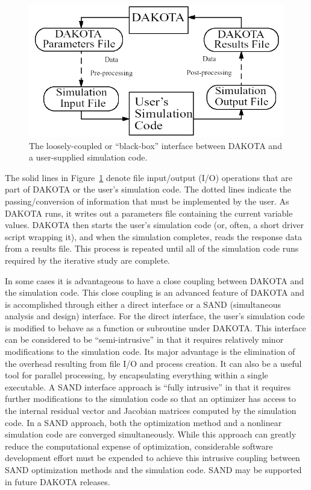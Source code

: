 \begin{figure}
  \centering
  \includegraphics[scale=0.60]{images/dakota_flowchart}
  \caption{The loosely-coupled or ``black-box'' interface between
    DAKOTA and a user-supplied simulation code.}
  \label{introduction:bbinterface}
\end{figure}

The solid lines in Figure~\ref{introduction:bbinterface} denote file
input/output (I/O) operations that are part of DAKOTA or the user's
simulation code. The dotted lines indicate the passing/conversion of
information that must be implemented by the user. As DAKOTA runs, it
writes out a parameters file containing the current variable values.
DAKOTA then starts the user's simulation code (or, often, a short
driver script wrapping it), and when the simulation completes, reads
the response data from a results file. This process is repeated until
all of the simulation code runs required by the iterative study are
complete.

In some cases it is advantageous to have a close coupling between
DAKOTA and the simulation code. This close coupling is an advanced
feature of DAKOTA and is accomplished through either a direct
interface or a SAND (simultaneous analysis and design) interface. For
the direct interface, the user's simulation code is modified to behave
as a function or subroutine under DAKOTA. This interface can be
considered to be ``semi-intrusive'' in that it requires relatively
minor modifications to the simulation code. Its major advantage is the
elimination of the overhead resulting from file I/O and process
creation. It can also be a useful tool for parallel processing, by
encapsulating everything within a single executable. A SAND interface
approach is ``fully intrusive'' in that it requires further
modifications to the simulation code so that an optimizer has access
to the internal residual vector and Jacobian matrices computed by the
simulation code. In a SAND approach, both the optimization method and
a nonlinear simulation code are converged simultaneously. While this
approach can greatly reduce the computational expense of optimization,
considerable software development effort must be expended to achieve
this intrusive coupling between SAND optimization methods and the
simulation code.  SAND may be supported in future DAKOTA releases.

